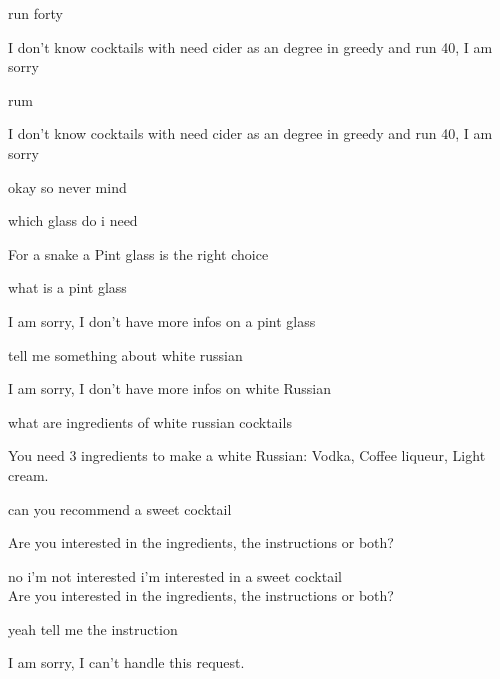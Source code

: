 \documentclass[12pt,letterpaper]{article}
\begin{document}
\begin{dialogue}
 run forty\\

 I don't know cocktails with need cider as an degree in greedy and run 40, I am sorry

 rum

 I don't know cocktails with need cider as an degree in greedy and run 40, I am sorry\\

 okay so never mind

 which glass do i need

 For a snake a Pint glass is the right choice

 what is a pint glass

 I am sorry, I don't have more infos on a pint glass

 tell me something about white russian

 I am sorry, I don't have more infos on white Russian\\

 what are ingredients of white russian cocktails

 You need 3 ingredients to make a white Russian: Vodka, Coffee liqueur, Light cream.

 can you recommend a sweet cocktail\\

 Are you interested in the ingredients, the instructions or both?

 no i'm not interested i'm interested in a sweet cocktail\\
 Are you interested in the ingredients, the instructions or both?

 yeah tell me the instruction

 I am sorry, I can't handle this request.\\
\end{dialogue}
\end{document}
